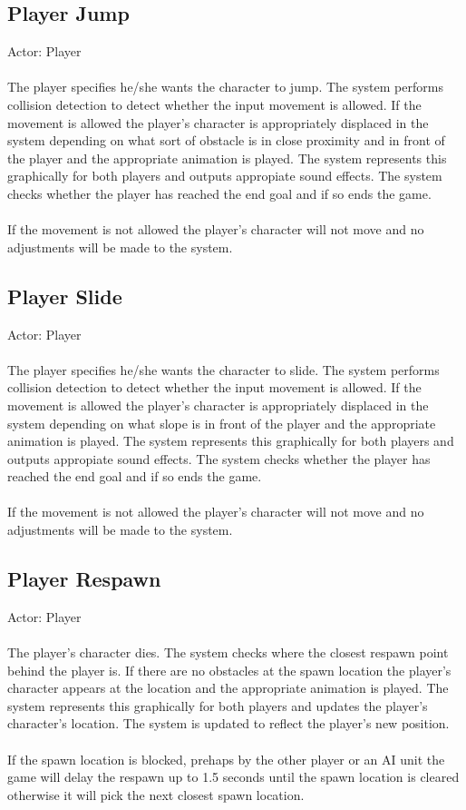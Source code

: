 \documentclass[a4paper,10pt]{article}
\begin{document}
\subsection{Player Jump}
Actor: Player\\\\
The player specifies he/she wants the character to jump. The system performs collision detection to detect whether the input movement is allowed. If the movement is allowed the player's character is appropriately displaced in the system depending on what sort of obstacle is in close proximity and in front of the player and the appropriate animation is played. The system represents this graphically for both players and outputs appropiate sound effects. The system checks whether the player has reached the end goal and if so ends the game.\\\\
If the movement is not allowed the player's character will not move and no adjustments will be made to the system.
\subsection{Player Slide}
Actor: Player\\\\
The player specifies he/she wants the character to slide. The system performs collision detection to detect whether the input movement is allowed. If the movement is allowed the player's character is appropriately displaced in the system depending on what slope is in front of the player and the appropriate animation is played. The system represents this graphically for both players and outputs appropiate sound effects. The system checks whether the player has reached the end goal and if so ends the game.\\\\
If the movement is not allowed the player's character will not move and no adjustments will be made to the system.
\subsection{Player Respawn}
Actor: Player\\\\
The player's character dies. The system checks where the closest respawn point behind the player is. If there are no obstacles at the spawn location the player's character appears at the location and the appropriate animation is played. The system represents this graphically for both players and updates the player's character's location.  The system is updated to reflect the player's new position. \\\\
If the spawn location is blocked, prehaps by the other player or an AI unit the game will delay the respawn up to 1.5 seconds until the spawn location is cleared otherwise it will pick the next closest spawn location.
\end{document}

